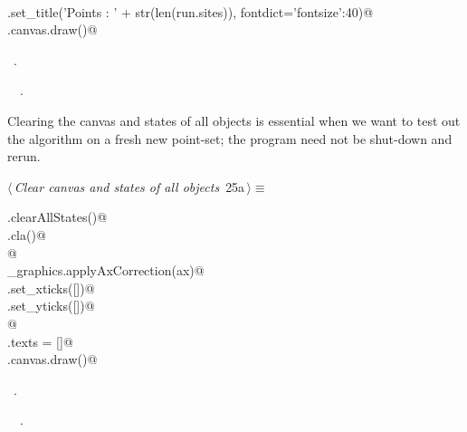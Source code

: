 \documentclass[11.5pt]{report}
\begin{document}
\begin{flushleft}
\begin{list}{}{}
\mbox{}\verb@@\\
\mbox{}\verb@ax.set_title('Points : ' + str(len(run.sites)), fontdict={'fontsize':40})@\\
\mbox{}\verb@fig.canvas.draw()@\\
\mbox{}\verb@@{\NWsep}
\end{list}
\vspace{-1.5ex}
\footnotesize
\begin{list}{}{\setlength{\itemsep}{-\parsep}\setlength{\itemindent}{-\leftmargin}}
\item \NWtxtMacroRefIn\ .
\item \NWtxtIdentsUsed\nobreak\  \verb@clearAllStates@\nobreak\ .
\item{}
\end{list}
\vspace{4ex}
\end{flushleft}

\vspace{-0.8cm}\newchunk Clearing the canvas and states of all objects is essential when we want to test out the algorithm on a fresh
new point-set; the program need not be shut-down and rerun. 
\begin{flushleft} \small\label{scrap28}\raggedright\small
{} $\langle\,${\itshape Clear canvas and states of all objects}\nobreak\ {\footnotesize {25a}}$\,\rangle\equiv$
\vspace{-1ex}
\begin{list}{}{} \item
\mbox{}\verb@run.clearAllStates()@\\
\mbox{}\verb@ax.cla()@\\
\mbox{}\verb@              @\\
\mbox{}\verb@utils_graphics.applyAxCorrection(ax)@\\
\mbox{}\verb@ax.set_xticks([])@\\
\mbox{}\verb@ax.set_yticks([])@\\
\mbox{}\verb@                 @\\
\mbox{}\verb@fig.texts = []@\\
\mbox{}\verb@fig.canvas.draw()@\\
\mbox{}\verb@@{\NWsep}
\end{list}
\vspace{-1.5ex}
\footnotesize
\begin{list}{}{\setlength{\itemsep}{-\parsep}\setlength{\itemindent}{-\leftmargin}}
\item \NWtxtMacroRefIn\ .
\item \NWtxtIdentsUsed\nobreak\  \verb@clearAllStates@\nobreak\ .
\item{}
\end{list}
\vspace{4ex}
\end{flushleft}
\end{document}
